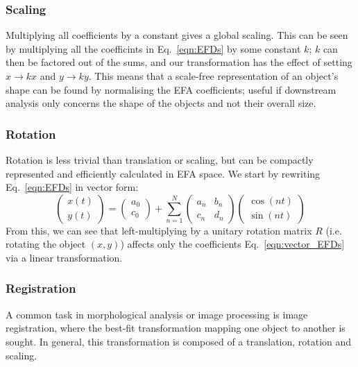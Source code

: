 \documentclass[11pt,a4paper,notitlepage]{article}
\begin{document}
\subsubsection{Scaling}
Multiplying all coefficients by a constant gives a global scaling.
This can be seen by multiplying all the coefficints in Eq.~\ref{eqn:EFDs} by some constant $k$;
$k$ can then be factored out of the sums, and our transformation has the effect of setting $x\rightarrow kx$
and $y\rightarrow ky$.
This means that a scale-free representation of an object's shape can be found by normalising the EFA coefficients;
useful if downstream analysis only concerns the shape of the objects and not their overall size.

\subsubsection{Rotation}
Rotation is less trivial than translation or scaling, but can be compactly represented and efficiently calculated in EFA space.
We start by rewriting Eq.~\ref{eqn:EFDs} in vector form:
\begin{equation}
	\label{eqn:vector_EFDs}
	\begin{pmatrix}
		x(t) \\
		y(t)
	\end{pmatrix}
	=
	\begin{pmatrix}
		a_0 \\
		c_0
	\end{pmatrix}
	+
	\sum_{n=1}^{N}
	\begin{pmatrix}
		a_n & b_n \\
		c_n & d_n
	\end{pmatrix}
	\begin{pmatrix}
		\cos(nt) \\
		\sin(nt)
	\end{pmatrix}
\end{equation}
From this, we can see that left-multiplying by a unitary rotation matrix $R$ (i.e. rotating the object $(x, y)$)
affects only the coefficients Eq.~\ref{eqn:vector_EFDs} via a linear transformation.

\subsubsection{Registration}
A common task in morphological analysis or image processing is image registration, where the best-fit
transformation mapping one object to another is sought.
In general, this transformation is composed of a translation, rotation and scaling.
\end{document}
